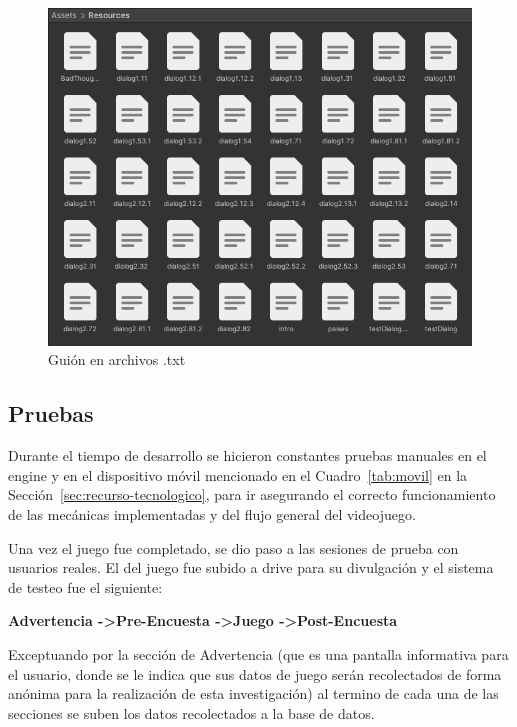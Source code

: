 \begin{figure}[h]
    \centering
    \includegraphics[scale=0.7]{imgs/unity-resources.png}
    \caption{Guión en archivos .txt}
    \label{fig:txts}
\end{figure}

\subsection{Pruebas}

Durante el tiempo de desarrollo se hicieron constantes pruebas manuales en el \gls{engine} y en el dispositivo móvil mencionado en el Cuadro~\ref{tab:movil} en la Sección~\ref{sec:recurso-tecnologico}, para ir asegurando el correcto funcionamiento de las mecánicas implementadas y del flujo general del videojuego.

Una vez el juego fue completado, se dio paso a las sesiones de prueba con usuarios reales. El  del juego fue subido a \Gls{drive} para su divulgación y el sistema de testeo fue el siguiente:

\begin{center}
    \textbf{Advertencia -\textgreater  Pre-Encuesta -\textgreater  Juego -\textgreater  Post-Encuesta}
\end{center}

Exceptuando por la sección de Advertencia (que es una pantalla informativa para el usuario, donde se le indica que sus datos de juego serán recolectados de forma anónima para la realización de esta investigación) al termino de cada una de las secciones se suben los datos recolectados a la base de datos.

